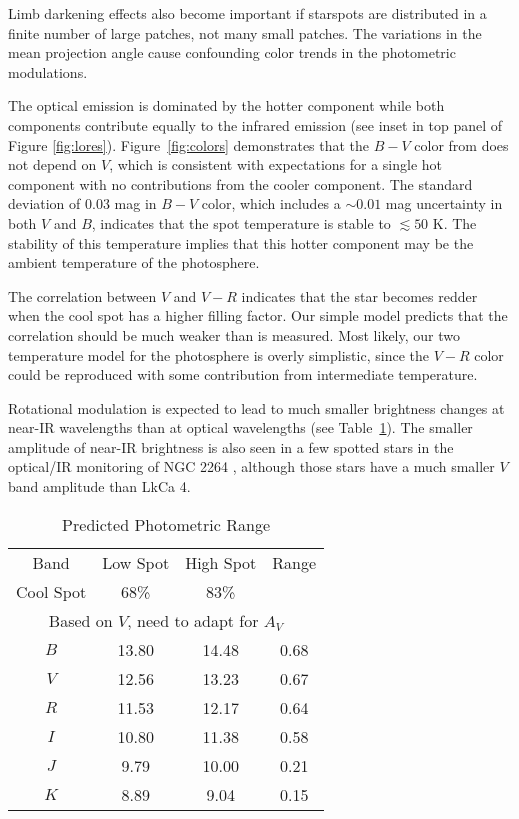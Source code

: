 \documentclass[twocolumn]{emulateapj}%
\begin{document}
Limb darkening effects also become important if starspots are distributed in a finite number of large patches, not many small patches.  The variations in the mean projection angle cause confounding color trends in the photometric modulations.

The optical emission is dominated by the hotter component while both components contribute equally to the infrared emission (see inset in top panel of Figure \ref{fig:lores}).  Figure~\ref{fig:colors} demonstrates that the $B-V$ color from \citet{grankin08} does not depend on $V$, which is consistent with expectations for a single hot component with no contributions from the cooler component.  The standard deviation of 0.03 mag in $B-V$ color, which includes a $\sim 0.01$ mag uncertainty in both $V$ and $B$, indicates that the spot temperature is stable to $\lesssim 50$ K.  The stability of this temperature implies that this hotter component may be the ambient temperature of the photosphere.

The correlation between $V$ and $V-R$ indicates that the star becomes redder when the cool spot has a higher filling factor.  Our simple model predicts that the correlation should be much weaker than is measured.  Most likely, our two temperature model for the photosphere is overly simplistic, since the $V-R$ color could be reproduced with some contribution from intermediate temperature.

Rotational modulation is expected to lead to much smaller brightness changes at near-IR wavelengths than at optical wavelengths (see Table~\ref{tab:photrange}).  The smaller amplitude of near-IR brightness is also seen in a few spotted stars in the optical/IR monitoring of NGC 2264 \citep{cody14}, although those stars have a much smaller $V$ band amplitude than LkCa 4.







\begin{table}
\caption{Predicted Photometric Range}
\centering
\label{tab:photrange}
\begin{tabular}{cccc}
\hline
Band & Low Spot & High Spot & Range\\
Cool Spot & 68\% & 83\% &\\
\hline
\multicolumn{4}{c}{Based on $V$, need to adapt for $A_V$}\\
$B$ & 13.80 & 14.48 & 0.68\\
$V$ & 12.56 & 13.23 & 0.67\\
$R$ & 11.53 & 12.17 & 0.64 \\
$I$ & 10.80 & 11.38 & 0.58\\
$J$ & 9.79 & 10.00 & 0.21\\
$K$ & 8.89 & 9.04 & 0.15\\
\hline
\end{tabular}
\end{table}
\end{document}
